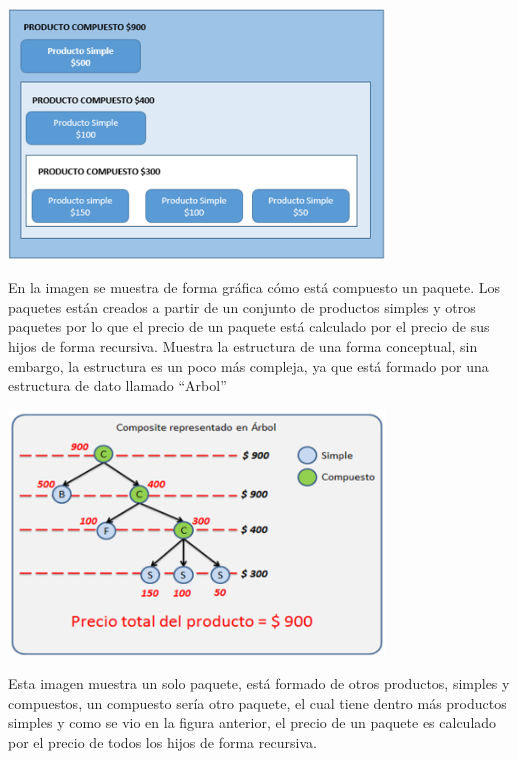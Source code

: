 \begin{flushleft}
\begin{center}
	\includegraphics[width=10cm]{./Imagenes/composite3} 
	\end{center}

En la imagen se muestra de forma gráfica cómo está compuesto un paquete.  Los paquetes están creados a partir de un conjunto de productos simples y otros paquetes por lo que el precio de un paquete está calculado por el precio de sus hijos de forma recursiva.  Muestra la estructura de una forma conceptual, sin embargo, la estructura es un poco más compleja, ya que está formado por una estructura de dato llamado “Arbol”

\begin{center}
	\includegraphics[width=10cm]{./Imagenes/composite4} 
	\end{center}

Esta imagen muestra un solo paquete, está formado de otros productos, simples y compuestos, un compuesto sería otro paquete, el cual tiene dentro más productos simples y como se vio en la figura anterior, el precio de un paquete es calculado por el precio de todos los hijos de forma recursiva.

\textbf{}\\ 
\textbf{}\\
\textbf{}\\
\textbf{}\\
\textbf{}\\
\textbf{}\\


\end{flushleft}
